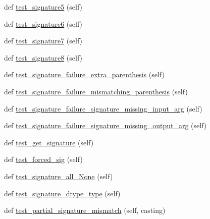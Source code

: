 \begin{DoxyCompactItemize}
\item 
def \hyperlink{classnumpy_1_1core_1_1tests_1_1test__ufunc_1_1TestUfunc_af0ee5b1d52a6ab20a0b3c96e720618de}{test\+\_\+signature5} (self)
\item 
def \hyperlink{classnumpy_1_1core_1_1tests_1_1test__ufunc_1_1TestUfunc_ad3fbc5cc1701573165c0064ecdee8e21}{test\+\_\+signature6} (self)
\item 
def \hyperlink{classnumpy_1_1core_1_1tests_1_1test__ufunc_1_1TestUfunc_abd0845f17e620eed77d90bc4eae288c7}{test\+\_\+signature7} (self)
\item 
def \hyperlink{classnumpy_1_1core_1_1tests_1_1test__ufunc_1_1TestUfunc_a1c992d450b05e833acc7903f1e47ea4e}{test\+\_\+signature8} (self)
\item 
def \hyperlink{classnumpy_1_1core_1_1tests_1_1test__ufunc_1_1TestUfunc_a26c0594cbbc7c4b6069c1d7483554ffe}{test\+\_\+signature\+\_\+failure\+\_\+extra\+\_\+parenthesis} (self)
\item 
def \hyperlink{classnumpy_1_1core_1_1tests_1_1test__ufunc_1_1TestUfunc_a3ad0d0831e5b05859f23a30dd1013591}{test\+\_\+signature\+\_\+failure\+\_\+mismatching\+\_\+parenthesis} (self)
\item 
def \hyperlink{classnumpy_1_1core_1_1tests_1_1test__ufunc_1_1TestUfunc_ab75da68578b28e6e1474defbd046f54b}{test\+\_\+signature\+\_\+failure\+\_\+signature\+\_\+missing\+\_\+input\+\_\+arg} (self)
\item 
def \hyperlink{classnumpy_1_1core_1_1tests_1_1test__ufunc_1_1TestUfunc_a523b7faaeb144a1f3227d8a549e763e4}{test\+\_\+signature\+\_\+failure\+\_\+signature\+\_\+missing\+\_\+output\+\_\+arg} (self)
\item 
def \hyperlink{classnumpy_1_1core_1_1tests_1_1test__ufunc_1_1TestUfunc_aa1e3a6ce8a058174bb5d486731c69429}{test\+\_\+get\+\_\+signature} (self)
\item 
def \hyperlink{classnumpy_1_1core_1_1tests_1_1test__ufunc_1_1TestUfunc_ad6c6c6c1382c51ec5df74f7b6fd7b1eb}{test\+\_\+forced\+\_\+sig} (self)
\item 
def \hyperlink{classnumpy_1_1core_1_1tests_1_1test__ufunc_1_1TestUfunc_ae0f28b51739f952ee556bd7d5a6ad003}{test\+\_\+signature\+\_\+all\+\_\+\+None} (self)
\item 
def \hyperlink{classnumpy_1_1core_1_1tests_1_1test__ufunc_1_1TestUfunc_a08538ce03d8b23747fcd0e80575b5346}{test\+\_\+signature\+\_\+dtype\+\_\+type} (self)
\item 
def \hyperlink{classnumpy_1_1core_1_1tests_1_1test__ufunc_1_1TestUfunc_aa41b35725339922f623d9edf06e5fe92}{test\+\_\+partial\+\_\+signature\+\_\+mismatch} (self, casting)

\end{DoxyCompactItemize}
